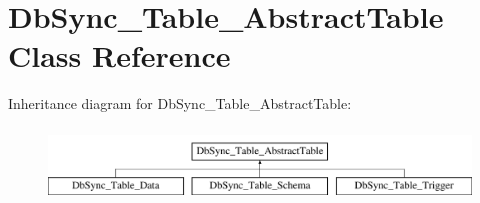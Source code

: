 \hypertarget{classDbSync__Table__AbstractTable}{
\section{DbSync\_\-Table\_\-AbstractTable Class Reference}
\label{classDbSync__Table__AbstractTable}
}
Inheritance diagram for DbSync\_\-Table\_\-AbstractTable:\begin{figure}[H]
\begin{center}
\leavevmode
\includegraphics[height=1.985816cm]{classDbSync__Table__AbstractTable}
\end{center}
\end{figure}
